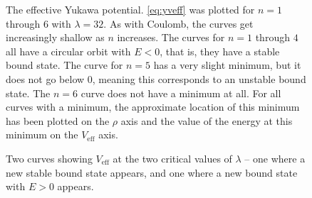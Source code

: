 \documentclass[12pt,twoside]{reedthesis}
\begin{document}
\begin{figure}[h!]
\caption[The effective Yukawa potential]{The effective Yukawa potential. \eqref{eq:yveff} was plotted for $n = 1$ through $6$ with $\lambda = 32$. As with Coulomb, the curves get increasingly shallow as $n$ increases. The curves for $n = 1$ through $4$ all have a circular orbit with $E < 0$, that is, they have a stable bound state. The curve for $n = 5$ has a very slight minimum, but it does not go below $0$, meaning this corresponds to an unstable bound state. The $n = 6$ curve does not have a minimum at all. For all curves with a minimum, the approximate location of this minimum has been plotted on the $\rho$ axis and the value of the energy at this minimum on the $V_{\mathrm{eff}}$ axis.}
\label{fig:yveff}
\end{figure}
\begin{figure}[h]
\caption[The two critical values of $\lambda$]{Two curves showing $V_{\mathrm{eff}}$ at the two critical values of $\lambda$ -- one where a new stable bound state appears, and one where a new bound state with $E > 0$ appears.}
\label{fig:critpoints}
\end{figure}
\end{document}
